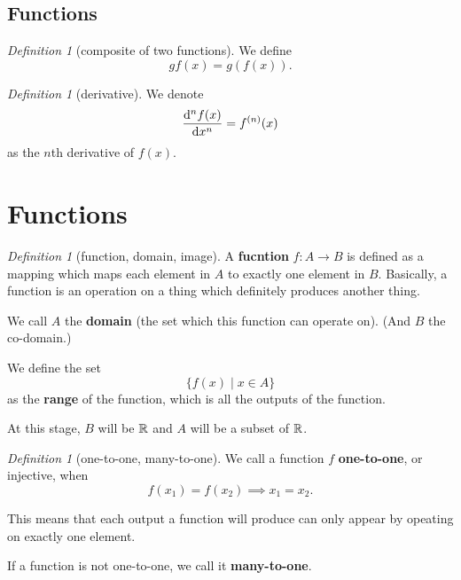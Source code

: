\documentclass[8pt]{article}
\theoremstyle{remark}
\newtheorem{definition}[theorem]{Definition}
\begin{document}
        \subsection{Functions}
            \begin{definition}[composite of two functions]
                We define
                $$
                    gf(x) = g(f(x)).
                $$
            \end{definition}

            \begin{definition}[derivative]
                We denote
                $$
                    \frac{\mathrm{d}^n f(x)}{\mathrm{d} x^n} = f^{(n)} (x)
                $$
                as the $n$th derivative of $f(x)$.
            \end{definition}

    \section{Functions}

        \begin{definition}[function, domain, image]
            A \textbf{fucntion} $f: A \rightarrow B$ is defined as a mapping which maps each element in $A$ to exactly one element in $B$. Basically, a function is an operation on a thing which definitely produces another thing.

            We call $A$ the \textbf{domain} (the set which this function can operate on). (And $B$ the co-domain.)

            We define the set
            $$
                \{f(x) \mid x \in A\}
            $$
            as the \textbf{range} of the function, which is all the outputs of the function.

            At this stage, $B$ will be $\mathbb{R}$ and $A$ will be a subset of $\mathbb{R}$.
        \end{definition}

        \begin{definition}[one-to-one, many-to-one]
            We call a function $f$ \textbf{one-to-one}, or injective, when
            $$
                f(x_1) = f(x_2) \implies x_1 = x_2.
            $$
            
            This means that each output a function will produce can only appear by opeating on exactly one element.

            If a function is not one-to-one, we call it \textbf{many-to-one}.
        \end{definition}
\end{document}
